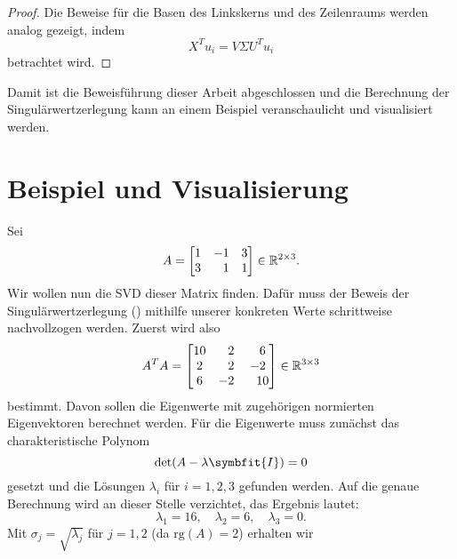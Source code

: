 \begin{proof}
    Die Beweise für die Basen des Linkskerns und des Zeilenraums werden analog gezeigt, indem
    \begin{equation*}
        X^{T}u_i = V \Sigma U^{T} u_i
    \end{equation*}
    betrachtet wird.
\end{proof}
Damit ist die Beweisführung dieser Arbeit abgeschlossen und die Berechnung der Singulärwertzerlegung kann an einem Beispiel veranschaulicht und visualisiert werden.
\section{Beispiel und Visualisierung}
\begin{example}\label{ex:svd}
    Sei 
    \begin{equation*}
        A =
        \begin{bmatrix}
            1 & -1 & 3 \\
            3 & \phantom{-}1 & 1
        \end{bmatrix} \in \mathbb{R}^{2 \times 3}.
    \end{equation*}
    Wir wollen nun die SVD dieser Matrix finden.
    Dafür muss der Beweis der Singulärwertzerlegung () mithilfe unserer konkreten Werte schrittweise nachvollzogen werden.
    Zuerst wird also
    \begin{equation*}
        A^{T}A = 
        \begin{bmatrix}
            10 & \phantom{-}2 & \phantom{-}6 \\
            2 & \phantom{-}2 & -2 \\
            6 & -2 & \phantom{-}10
        \end{bmatrix} \in \mathbb{R}^{3 \times 3}
    \end{equation*}
    bestimmt. 
    Davon sollen die Eigenwerte mit zugehörigen normierten Eigenvektoren berechnet werden.
    Für die Eigenwerte muss zunächst das charakteristische Polynom 
    \begin{equation*}
        \text{det}(A - \lambda \symbfit{I}) = 0
    \end{equation*}    
    gesetzt und die Lösungen \(\lambda_i\) für \(i =1,2,3\) gefunden werden.
    Auf die genaue Berechnung wird an dieser Stelle verzichtet, das Ergebnis lautet:
    \begin{equation*}
        \lambda_1 = 16, \quad 
        \lambda_2 = 6, \quad
        \lambda_3 = 0.
    \end{equation*}
    Mit \(\sigma_j = \sqrt{\lambda_j}\) für \(j = 1, 2\) (da \(\text{rg}(A)=2\)) erhalten wir

\end{example}
